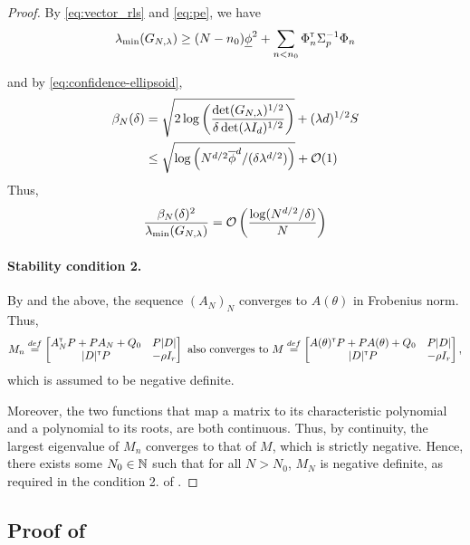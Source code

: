 \documentclass{article}
\begin{document}
\begin{proof}
	By \eqref{eq:vector_rls} and \eqref{eq:pe}, we have $$\lambda_{\min}(G_{N,\lambda}) \geq (N-n_0)\underline{\phi}^2 + \sum_{n<n_0}\Phi_{n}^{\mathsf{\scriptscriptstyle T}}\Sigma_{p}^{-1}\Phi_{n}$$
	
	and by \eqref{eq:confidence-ellipsoid},
	\begin{align*}
	\beta_N(\delta) &= \sqrt{2\log \left(\frac{\det(G_{N,\lambda})^{1/2}}{\delta\det(\lambda I_d)^{1/2}}\right)}
	+ (\lambda d)^{1/2}S\\
	&\leq \sqrt{\log \left(N^{d/2}\overline{\phi}^d / (\delta\lambda^{d/2})\right)} + \mathcal{O}(1)
	\end{align*}
	Thus,
	\[
	\frac{\beta_N(\delta)^2}{\lambda_{\min}(G_{N,\lambda})} = \mathcal{O}\left(\frac{\log (N^{d/2}/\delta)}{N} \right)
	\]
	
\paragraph{Stability condition 2.}

By  and the above, the sequence $(A_N)_{N}$ converges to $A(\theta)$ in Frobenius norm. Thus, 
$$M_n \stackrel{def}{=} \begin{bmatrix}
A_N^{\mathsf{\scriptscriptstyle T}} P + P A_N + Q_0 & P|D|  \\
|D|^{\mathsf{\scriptscriptstyle T}} P & -\rho I_r \\
\end{bmatrix}\text{ also converges to } M\stackrel{def}{=}\begin{bmatrix}
A(\theta)^{\mathsf{\scriptscriptstyle T}} P + P A(\theta) + Q_0 & P|D|  \\
|D|^{\mathsf{\scriptscriptstyle T}} P & -\rho I_r \\
\end{bmatrix},$$ which is assumed to be negative definite.

Moreover, the two functions that map a matrix to its characteristic polynomial and a polynomial to its roots, are both continuous. Thus, by continuity, the largest eigenvalue of $M_n$ converges to that of $M$, which is strictly negative. Hence, there exists some $N_0\in\mathbb{N}$ such that for all $N>N_0$, $M_N$ is negative definite, as required in the condition 2. of .
\end{proof}


\subsection{Proof of }
\end{document}
